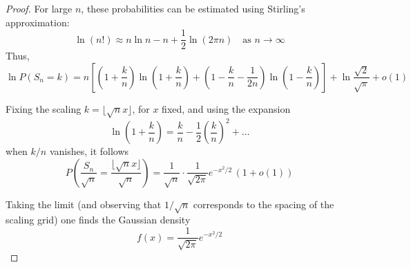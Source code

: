 \begin{proof}
For large $n$, these probabilities can be estimated using Stirling’s approximation:
\begin{equation*}
    \ln (n!) \approx n \ln n - n + \frac{1}{2} \ln (2 \pi n) \quad \text{as } n \to \infty  
\end{equation*}
Thus, 
\begin{equation*}
    \ln P(S_n = k) 
    = n \left[ \left(1 + \frac{k}{n} \right) \ln \left(1 + \frac{k}{n} \right) 
    + \left(1 - \frac{k}{n} - \frac{1}{2n} \right) \ln \left(1 - \frac{k}{n} \right) \right] 
    + \ln \frac{\sqrt{2}}{\sqrt{\pi}} + o(1)
\end{equation*}

Fixing the scaling $k = \lfloor \sqrt{n} x \rfloor$, for $x$ fixed, and using the expansion 
\begin{equation*}
    \ln \left(1 + \frac{k}{n}\right) = \frac{k}{n} - \frac{1}{2}\left(\frac{k}{n}\right)^2 + \ldots
\end{equation*}
when $k/n$ vanishes, it follows
\begin{equation*}
    P\left( \frac{S_n}{\sqrt{n}} = \frac{\lfloor \sqrt{n}x \rfloor}{\sqrt{n}} \right) = \frac{1}{\sqrt{n}} \cdot \frac{1}{\sqrt{2\pi}} e^{-x^2/2} \, (1 + o(1))
\end{equation*}

Taking the limit (and observing that $1/\sqrt{n}$ corresponds to the spacing of the scaling grid) one finds the Gaussian density
\begin{equation*}
    f(x) = \frac{1}{\sqrt{2\pi}} e^{-x^2/2}
\end{equation*}
\end{proof}